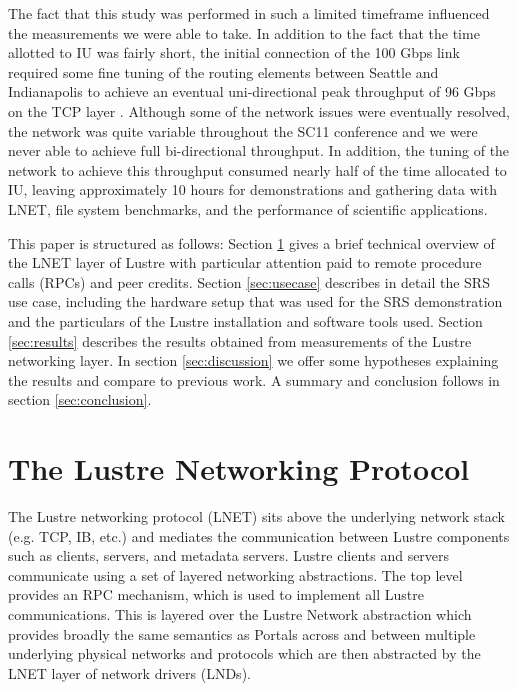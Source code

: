 \documentclass[]{sigplan-proc}
\begin{document}
The fact that this study was performed in such a limited timeframe influenced the measurements we were able to
take. In addition to the fact that the time allotted to IU was fairly short, the initial connection of the 100
Gbps link required some fine tuning of the routing elements between Seattle and Indianapolis to achieve an
eventual uni-directional peak throughput of 96 Gbps on the TCP layer \cite{henschel2012}. Although some of the
network issues were eventually resolved, the network was quite variable throughout the SC11 conference and we
were never able to achieve full bi-directional throughput. In addition, the tuning of the network to achieve
this throughput consumed nearly half of the time allocated to IU, leaving approximately 10 hours for
demonstrations and gathering data with LNET, file system benchmarks, and the performance of scientific
applications.

This paper is structured as follows: Section \ref{sec:LNET} gives a brief technical overview of the LNET layer
of Lustre with particular attention paid to remote procedure calls (RPCs) and peer credits. Section
\ref{sec:usecase} describes in detail the SRS use case, including the hardware setup that was used for the SRS
demonstration and the particulars of the Lustre installation and software tools used. Section
\ref{sec:results} describes the results obtained from measurements of the Lustre networking layer. In section
\ref{sec:discussion} we offer some hypotheses explaining the results and compare to previous work. A summary and conclusion follows in section \ref{sec:conclusion}.

\section{The Lustre Networking Protocol}\label{sec:LNET}

The Lustre networking protocol (LNET) sits above the underlying network stack (e.g. TCP, IB, etc.) and
mediates the communication between Lustre components such as clients, servers, and metadata servers.  Lustre
clients and servers communicate using a set of layered networking abstractions.  The top level provides an RPC
mechanism, which is used to implement all Lustre communications.  This is layered over the Lustre Network
abstraction which provides broadly the same semantics as Portals \cite{portalspec} across and between multiple
underlying physical networks and protocols which are then abstracted by the LNET layer of network drivers (LNDs).
\end{document}
